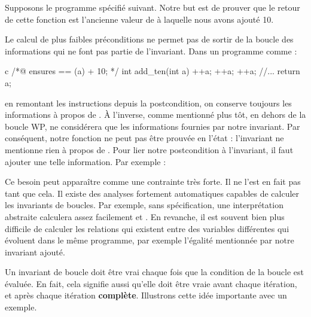 

Supposons le programme spécifié suivant. Notre but est de prouver que le retour
de cette fonction est l'ancienne valeur de  à laquelle nous avons ajouté 10.






Le calcul de plus faibles préconditions ne permet pas de sortir de la boucle des
informations qui ne font pas partie de l'invariant. Dans un programme comme :



\begin{CodeBlock}{c}
/*@
    ensures \result == \old(a) + 10;
*/
int add_ten(int a){
    ++a;
    ++a;
    ++a;
    //...
    return a;
}
\end{CodeBlock}



en remontant les instructions depuis la postcondition, on conserve toujours les
informations à propos de . À l'inverse, comme mentionné plus tôt, en dehors
de la boucle WP, ne considérera que les informations fournies par notre
invariant. Par conséquent, notre fonction  ne peut pas être prouvée
en l'état : l'invariant ne mentionne rien à propos de . Pour lier notre
postcondition à l'invariant, il faut ajouter une telle information. Par
exemple :






\begin{Information}
Ce besoin peut apparaître comme une contrainte très forte. Il ne l'est en fait pas
tant que cela. Il existe des analyses fortement automatiques capables de
calculer les invariants de boucles. Par exemple, sans spécification, une
interprétation abstraite calculera assez facilement  et
. En revanche, il est souvent bien plus difficile
de calculer les relations qui existent entre des variables différentes qui
évoluent dans le même programme, par exemple l'égalité mentionnée par notre
invariant ajouté.
\end{Information}




Un invariant de boucle doit être vrai chaque fois que la condition de la boucle est
évaluée. En fait, cela signifie aussi qu'elle doit être vraie avant chaque itération,
et après chaque itération \textbf{complète}. Illustrons cette idée importante avec un
exemple.


